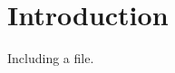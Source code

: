 \documentclass{article}
\begin{document}
\section{Introduction}
Including a file.



\end{document}
